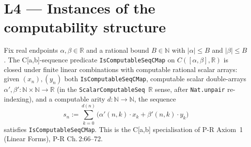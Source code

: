\chapter{L4 — Instances of the computability structure}


\begin{lemma}
  \label{lem:l4_cmap_axiom1}
  \leanok
  Fix real endpoints $\alpha, \beta \in \mathbb{R}$ and a rational bound $B \in \mathbb{N}$ with $|\alpha| \le B$ and $|\beta| \le B$. The C[a,b]-sequence predicate \texttt{IsComputableSeqCMap} on $C([\alpha,\beta], \mathbb{R})$ is closed under finite linear combinations with computable rational scalar arrays: given $(x_n), (y_n)$ both \texttt{IsComputableSeqCMap}, computable scalar double-arrays $\alpha', \beta' : \mathbb{N} \times \mathbb{N} \to \mathbb{R}$ (in the \texttt{ScalarComputableSeq}~$\mathbb{R}$ sense, after \texttt{Nat.unpair} re-indexing), and a computable arity $d : \mathbb{N} \to \mathbb{N}$, the sequence
  \[ s_n := \sum_{k = 0}^{d(n)} \bigl( \alpha'(n, k) \cdot x_k + \beta'(n, k) \cdot y_k \bigr) \]
  satisfies \texttt{IsComputableSeqCMap}. This is the C[a,b] specialisation of P-R Axiom~1 (Linear Forms), P-R Ch.\,2:66--72.
\end{lemma}
